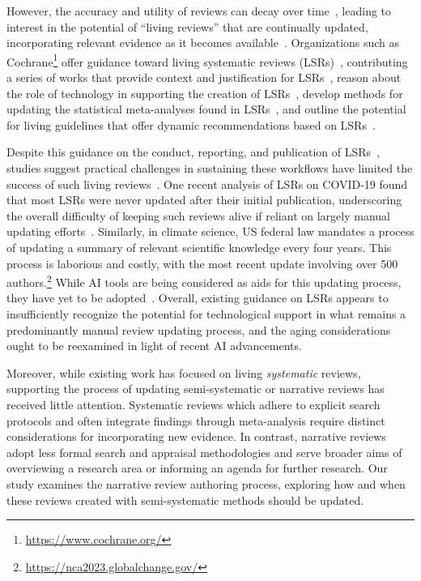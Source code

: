 However, the accuracy and utility of reviews can decay over time~\cite{Shekelle2001ValidityOT, elliott2017living}, leading to interest in the potential of ``living reviews'' that are continually updated, incorporating relevant evidence as it becomes available~\cite{elliott2014living}. Organizations such as Cochrane\footnote{\url{https://www.cochrane.org/}} offer guidance toward living systematic reviews (LSRs)~\cite{elliott2017living}, contributing a series of works that provide context and justification for LSRs~\cite{elliott2017living}, reason about the role of technology in supporting the creation of LSRs~\cite{thomas2017living}, develop methods for updating the statistical meta-analyses found in LSRs~\cite{simmonds2017living}, and outline the potential for living guidelines that offer dynamic recommendations based on LSRs~\cite{akl2017living}.

Despite this guidance on the conduct, reporting, and publication of LSRs~\cite{cochrane2019handbook, elliott2017living}, studies suggest practical challenges in sustaining these workflows have limited the success of such living reviews~\cite{tricco2008following, heron2023update}. One recent analysis of LSRs on COVID-19 found that most LSRs were never updated after their initial publication, underscoring the overall difficulty of keeping such reviews alive if reliant on largely manual updating efforts~\cite{heron2023update}. Similarly, in climate science, US federal law mandates a process of updating a summary of relevant scientific knowledge every four years. This process is laborious and costly, with the most recent update involving over 500 authors.\footnote{\url{https://nca2023.globalchange.gov/}} While AI tools are being considered as aids for this updating process, they have yet to be adopted~\cite{AlKhourdajie2024TheRO}. Overall, existing guidance on LSRs appears to insufficiently recognize the potential for technological support in what remains a predominantly manual review updating process, and the aging considerations ought to be reexamined in light of recent AI advancements.

Moreover, while existing work has focused on living \textit{systematic} reviews, supporting the process of updating semi-systematic or narrative reviews has received little attention.
Systematic reviews which adhere to explicit search protocols and often integrate findings through meta-analysis require distinct considerations for incorporating new evidence. In contrast, narrative reviews adopt less formal search and appraisal methodologies and serve broader aims of overviewing a research area or informing an agenda for further research. Our study examines the narrative review authoring process, exploring how and when these reviews created with semi-systematic methods should be updated.

